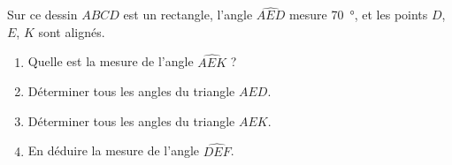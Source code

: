 
\begin{exercice}\label{exo2smath-0327}


    \begin{multicols}{2}

    Sur ce dessin \( ABCD\) est un rectangle, l'angle \( \widehat{AED}\) mesure \SI{70}{\degree}, et les points \( D\), \( E\), \( K\) sont alignés.
    \begin{enumerate}
        \item
            Quelle est la mesure de l'angle \( \widehat{AEK}\) ?
        \item
            Déterminer tous les angles du triangle \( AED\).
        \item
            Déterminer tous les angles du triangle \( AEK\).
        \item
            En déduire la mesure de l'angle \( \widehat{DEF}\).
    \end{enumerate}

\columnbreak

\begin{center}

\end{center}

    \end{multicols}

\end{exercice}
